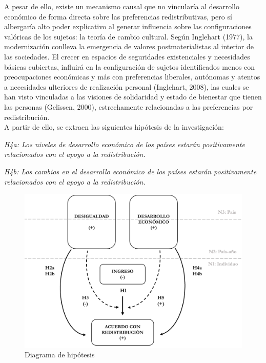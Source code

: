 \documentclass[12pt,letterpaper]{article}
\begin{document}
A pesar de ello, existe un mecanismo causal que no vincularía al desarrollo económico de forma directa sobre las preferencias redistributivas, pero sí albergaría alto poder explicativo al generar influencia sobre las configuraciones valóricas de los sujetos: la teoría de cambio cultural. Según Inglehart (1977), la modernización conlleva la emergencia de valores postmaterialistas al interior de las sociedades. El crecer en espacios de seguridades existenciales y necesidades básicas cubiertas, influirá en la configuración de sujetos identificados menos con preocupaciones económicas y más con preferencias liberales, autónomas y atentos a necesidades ulteriores de realización personal (Inglehart, 2008), las cuales se han visto vinculadas a las visiones de solidaridad y estado de bienestar que tienen las personas (Gelissen, 2000), estrechamente relacionadas a las preferencias por redistribución.\\

A partir de ello, se extraen las siguientes hipótesis de la investigación:

\textit{H4a: Los niveles de desarrollo económico de los países estarán positivamente relacionados con el apoyo a la redistribución.}

\textit{H4b: Los cambios en el desarrollo económico de los países estarán positivamente relacionados con el apoyo a la redistribución.}\\

\begin{figure}[t]
	\begin{center}
		\includegraphics[width=1\textwidth]{Hipotesis.pdf}
		\caption[Diagrama de hipótesis]{Diagrama de hipótesis}
		\label{fig:hip}
	\end{center}
\end{figure}
\end{document}

